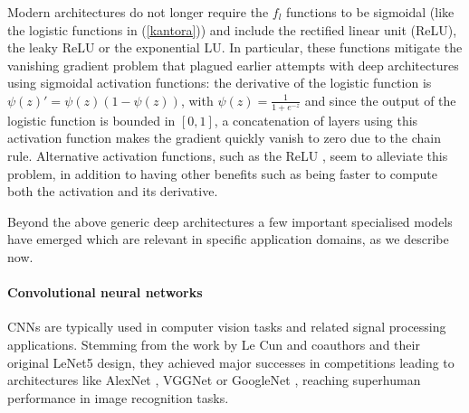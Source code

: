Modern architectures do not longer require the
$f_l$ functions to be sigmoidal (like the  
logistic functions in (\ref{kantora})) and include  
the rectified linear unit (ReLU), the leaky ReLU
or the exponential LU. In particular, these functions mitigate the vanishing gradient problem \cite{kolen2001gradient} that 
plagued earlier attempts with deep architectures using sigmoidal
activation functions: the derivative of the logistic function is $\psi(z)' = \psi(z)(1 - \psi(z))$, with $\psi(z) = \frac{1}{1 + e^{-z}}$ and since the output of the logistic function is bounded in $\left[ 0, 1 \right]$, a concatenation of layers using this activation function makes the gradient quickly vanish to zero due to the chain rule. Alternative activation functions, such as the ReLU \cite{glorot2010understanding}, seem to alleviate this problem, in addition to having other benefits such as being faster to compute both the activation and its derivative.

Beyond the above generic deep architectures 
a few important specialised models have emerged which 
are relevant in specific application domains,
as we describe now. 
\paragraph{Convolutional neural networks} 
CNNs are typically used 
 in computer vision tasks and related signal processing applications.
 Stemming from the work by Le Cun and coauthors  
  \cite{lecun89, lecun98} and their original 
  LeNet5 design, they achieved major
 successes  in  competitions \cite{krizhevsky2017imagenet}
 leading to architectures like 
 AlexNet       \cite{NIPS2012_c399862d}, VGGNet \cite{simonyan2014very} or
 GoogleNet \cite{szegedy2015going}, reaching 
 superhuman performance in 
 image recognition tasks.
 
